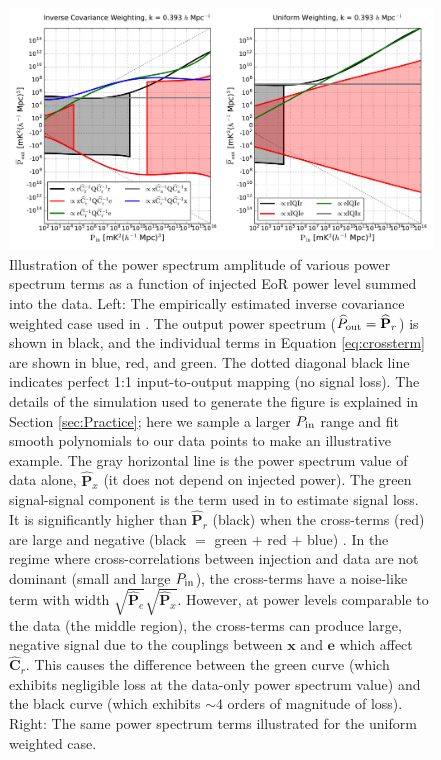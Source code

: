 \documentclass[preprint2,numberedappendix,tighten]{aastex6}  %
\begin{document}
\begin{figure}
	\centering
	\includegraphics[width=1\textwidth]{plots/sigloss_terms.pdf}
	\caption{Illustration of the power spectrum amplitude of various power spectrum terms as a function of injected EoR power level summed into the 
data. Left: The empirically estimated inverse covariance weighted case used in . The output power spectrum ($\widehat{P}_{\rm out}=\widehat{\textbf{P}}_r$) is shown in black, and the individual terms in Equation 
\eqref{eq:crossterm} are shown in blue, red, and green. The dotted diagonal black line indicates perfect 1:1 input-to-output mapping (no signal loss). The details of the simulation used to generate the figure is explained in Section 
\ref{sec:Practice}; here we sample a larger $P_{\rm in}$ range and fit smooth polynomials to our data points to make an illustrative example.  The gray 
horizontal line is the power spectrum value of data alone, $\widehat{\textbf{P}}_{x}$ (it does not depend on injected power). The green signal-signal 
component is the term used in  to estimate signal loss. It is significantly higher 
than $\widehat{\textbf{P}}_{r}$ (black) when the cross-terms (red) are large and negative (black $=$ green $+$ red $+$ blue) . In the 
regime where cross-correlations between injection and data are not dominant (small and large $P_{\rm in}$), the cross-terms have a noise-like 
term with width $\sqrt{\widehat{\textbf{P}}_e}\sqrt{\widehat{\textbf{P}}_x}$. However, at power levels comparable to the data (the middle region), the cross-terms can produce large, negative signal due to the couplings between $\textbf{x}$ and $\textbf{e}$ which affect 
$\widehat{\textbf{C}}_{r}$. This causes the difference between the green curve (which exhibits negligible loss at 
the data-only power spectrum value) and the black curve (which exhibits $\sim$$4$ orders of magnitude of loss). Right: The same power spectrum terms illustrated for the uniform weighted case.}
	\label{fig:sigloss_terms}
\end{figure}
\end{document}
